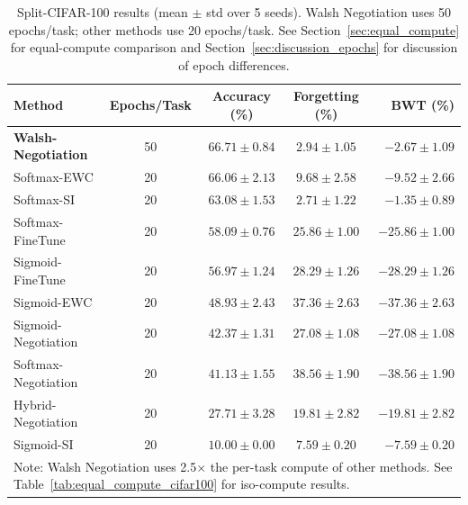 \documentclass[preprint,review,12pt]{elsarticle}
\begin{document}
\begin{table}[t]
\centering
\caption{Split-CIFAR-100 results (mean $\pm$ std over 5 seeds). Walsh Negotiation uses 50 epochs/task; other methods use 20 epochs/task. See Section~\ref{sec:equal_compute} for equal-compute comparison and Section~\ref{sec:discussion_epochs} for discussion of epoch differences.}
\label{tab:cifar100_multiseed}
\begin{tabular}{lcccr}
\toprule
Method & Epochs/Task & Accuracy (\%) & Forgetting (\%) & BWT (\%) \\
\midrule
\textbf{Walsh-Negotiation} & 50 & $\mathbf{66.71 \pm 0.84}$ & $\mathbf{2.94 \pm 1.05}$ & $\mathbf{-2.67 \pm 1.09}$ \\
Softmax-EWC & 20 & $66.06 \pm 2.13$ & $9.68 \pm 2.58$ & $-9.52 \pm 2.66$ \\
Softmax-SI & 20 & $63.08 \pm 1.53$ & $2.71 \pm 1.22$ & $-1.35 \pm 0.89$ \\
Softmax-FineTune & 20 & $58.09 \pm 0.76$ & $25.86 \pm 1.00$ & $-25.86 \pm 1.00$ \\
Sigmoid-FineTune & 20 & $56.97 \pm 1.24$ & $28.29 \pm 1.26$ & $-28.29 \pm 1.26$ \\
Sigmoid-EWC & 20 & $48.93 \pm 2.43$ & $37.36 \pm 2.63$ & $-37.36 \pm 2.63$ \\
Sigmoid-Negotiation & 20 & $42.37 \pm 1.31$ & $27.08 \pm 1.08$ & $-27.08 \pm 1.08$ \\
Softmax-Negotiation & 20 & $41.13 \pm 1.55$ & $38.56 \pm 1.90$ & $-38.56 \pm 1.90$ \\
\midrule
Hybrid-Negotiation & 20 & $27.71 \pm 3.28$ & $19.81 \pm 2.82$ & $-19.81 \pm 2.82$ \\
Sigmoid-SI & 20 & $10.00 \pm 0.00$ & $7.59 \pm 0.20$ & $-7.59 \pm 0.20$ \\
\bottomrule
\multicolumn{5}{l}{\scriptsize Note: Walsh Negotiation uses 2.5$\times$ the per-task compute of other methods. See Table~\ref{tab:equal_compute_cifar100} for iso-compute results.}
\end{tabular}
\end{table}
\end{document}
